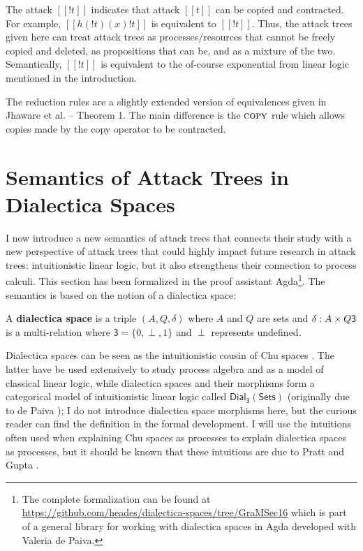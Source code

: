 \documentclass{llncs}
\let\to\relax
\newcommand{\to}{\rightarrow}
\newcommand{\dial}[0]{\mathsf{Dial_3}(\mathsf{Sets})}
\begin{document}
The attack $[[! t]]$ indicates that attack $[[t]]$ can be copied and
contracted.  For example, $[[h(!t) (x) !t]]$ is equivalent to $[[!
    t]]$.  Thus, the attack trees given here can treat attack trees as
processes/resources that cannot be freely copied and deleted, as
propositions that can be, and as a mixture of the two.  Semantically,
$[[! t]]$ is equivalent to the of-course exponential from linear logic
mentioned in the introduction.

The reduction rules are a slightly extended version of equivalences
given in Jhaware et al. \cite{Jhawar:2015} -- Theorem 1.  The main
difference is the $\textsc{copy}$ rule which allows copies made by the
copy operator to be contracted.

\section{Semantics of Attack Trees in Dialectica Spaces}
\label{sec:concrete_semantics_of_attack_trees_in_dialectica_spaces}

I now introduce a new semantics of attack trees that connects their
study with a new perspective of attack trees that could highly impact
future research in attack trees: intuitionistic linear logic, but it
also strengthens their connection to process calculi.  This section
has been formalized in the proof assistant Agda\footnote{The complete
  formalization can be found at
  \url{https://github.com/heades/dialectica-spaces/tree/GraMSec16}
  which is part of a general library for working with dialectica
  spaces in Agda developed with Valeria de Paiva.}.  The semantics is
based on the notion of a dialectica space:

\begin{definition}
  \label{def:dialectica-space}
  A \textbf{dialectica space} is a triple $(A, Q, \delta)$ where $A$
  and $Q$ are sets and $\delta : A \times Q \to \mathsf{3}$ is a
  multi-relation where $\mathsf{3} = \{0,\perp,1\}$ and $\perp$
  represents undefined.
\end{definition}

Dialectica spaces can be seen as the intuitionistic cousin
\cite{dePaiva:2006b} of Chu spaces \cite{Pratt:1999}.  The latter have
be used extensively to study process algebra and as a model of
classical linear logic, while dialectica spaces and their morphisms
form a categorical model of intuitionistic linear logic called $\dial$
(originally due to de Paiva \cite{dePaiva:1987}); I do not introduce
dialectica space morphisms here, but the curious reader can find the
definition in the formal development. I will use the intuitions often
used when explaining Chu spaces as processes to explain dialectica
spaces as processes, but it should be known that these intuitions are
due to Pratt and Gupta \cite{Gupta:1994}.
\end{document}
